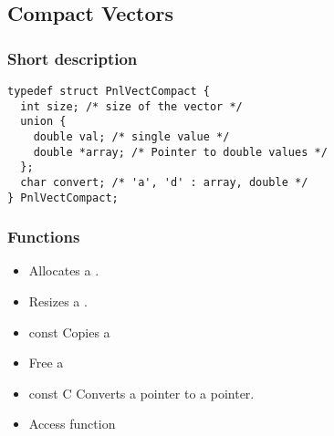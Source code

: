 \subsection{Compact Vectors}
\subsubsection{Short description}

\begin{verbatim}
typedef struct PnlVectCompact {
  int size; /* size of the vector */
  union {
    double val; /* single value */
    double *array; /* Pointer to double values */
  };
  char convert; /* 'a', 'd' : array, double */
} PnlVectCompact;
\end{verbatim}

\subsubsection{Functions}

\begin{itemize}
\item {}
  \sshortdescribe Allocates a .  

\item {} 
  \sshortdescribe Resizes a .  

\item {} {const \ptr {}}
  \sshortdescribe Copies a   

\item {}
  \sshortdescribe Free a   

\item {}
  {const  \ptr C} 
  \sshortdescribe Converts a  pointer to a  pointer.  

\item {}
  \sshortdescribe Access function  
\end{itemize}

